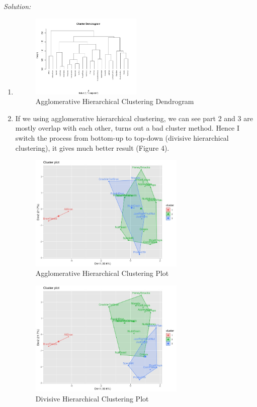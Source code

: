 \documentclass{article}
\newenvironment{solution}
    {\textit{Solution:}}
    {}
\begin{document}
\begin{solution}
\begin{enumerate}
\newpage
\item\mbox{}
	\begin{figure}[h]
		\centering
		\includegraphics[width=0.5\textwidth]{Figure2_Rplot.jpeg}
		\caption{Agglomerative Hierarchical Clustering Dendrogram}
	\end{figure}
\item\mbox{}
If we using agglomerative hierarchical clustering, we can see part 2 and 3 are mostly overlap with each other, turns out a bad cluster method. Hence I switch the process from bottom-up to top-down (divisive hierarchical clustering), it gives much better result (Figure 4).
	\begin{figure}[h]
		\centering
		\includegraphics[width=0.7\textwidth]{Figure3a_Rplot.jpeg}
		\caption{Agglomerative Hierarchical Clustering Plot}
	\end{figure}
\newpage
	\begin{figure}[h]
		\centering
		\includegraphics[width=0.7\textwidth]{Figure3b_Rplot.jpeg}
		\caption{Divisive Hierarchical Clustering Plot}
	\end{figure}
\end{enumerate}
\end{solution}
\end{document}

